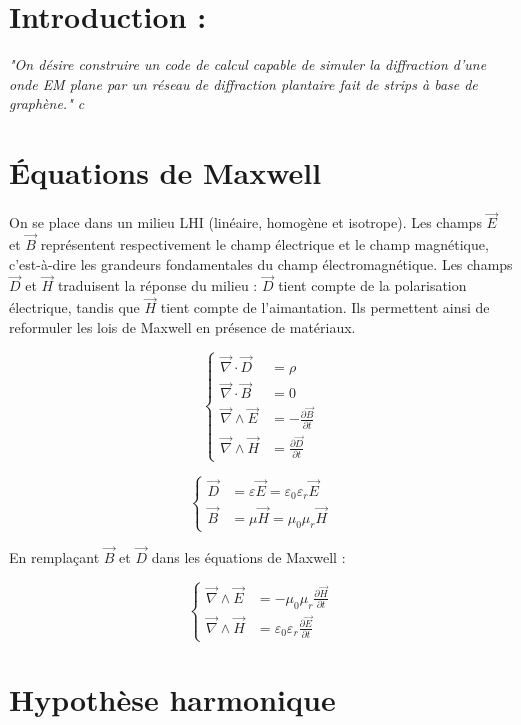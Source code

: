 \documentclass{article}
\begin{document}
\section*{Introduction :}
\bigskip
\textit{"On désire construire un code de calcul capable de simuler la diffraction d’une onde EM plane
par un réseau de diffraction plantaire fait de strips à base de graphène."
c}
\section*{Équations de Maxwell}

On se place dans un milieu LHI (linéaire, homogène et isotrope). Les champs \( \vec{E} \) et \( \vec{B} \) représentent respectivement le champ électrique et le champ magnétique, c’est-à-dire les grandeurs fondamentales du champ électromagnétique. Les champs \( \vec{D} \) et \( \vec{H} \) traduisent la réponse du milieu : \( \vec{D} \) tient compte de la polarisation électrique, tandis que \( \vec{H} \) tient compte de l’aimantation. Ils permettent ainsi de reformuler les lois de Maxwell en présence de matériaux.


\[
\left\{
\begin{aligned}
\vec{\nabla} \cdot \vec{D} &= \rho \\
\vec{\nabla} \cdot \vec{B} &= 0 \\
\vec{\nabla} \wedge \vec{E} &= -\frac{\partial \vec{B}}{\partial t} \\
\vec{\nabla} \wedge \vec{H} &= \frac{\partial \vec{D}}{\partial t}
\end{aligned}
\right.
\]


\[
\left\{
\begin{aligned}
\vec{D} &= \varepsilon \vec{E} = \varepsilon_0 \varepsilon_r \vec{E} \\
\vec{B} &= \mu \vec{H} = \mu_0 \mu_r \vec{H}
\end{aligned}
\right.
\]

En remplaçant \(\vec{B}\) et \(\vec{D}\) dans les équations de Maxwell :

\[
\left\{
\begin{aligned}
\vec{\nabla} \wedge \vec{E} &= - \mu_0 \mu_r \frac{\partial \vec{H}}{\partial t} \\
\vec{\nabla} \wedge \vec{H} &= \varepsilon_0 \varepsilon_r \frac{\partial \vec{E}}{\partial t}
\end{aligned}
\right.
\]

\section*{Hypothèse harmonique}
\end{document}
